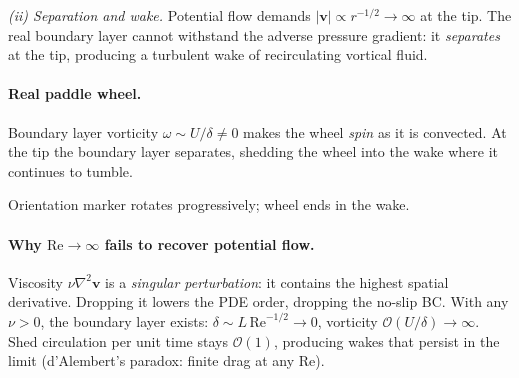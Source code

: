 \documentclass[11pt]{article}
\begin{document}
\textit{(ii) Separation and wake.} Potential flow demands $|\bm v|\propto r^{-1/2}\to\infty$ at the tip. The real boundary layer cannot withstand the adverse pressure gradient: it \emph{separates} at the tip, producing a turbulent wake of recirculating vortical fluid.

\paragraph{Real paddle wheel.} Boundary layer vorticity $\omega\sim U/\delta\neq 0$ makes the wheel \emph{spin} as it is convected. At the tip the boundary layer separates, shedding the wheel into the wake where it continues to tumble.

\begin{center}
\end{center}
Orientation marker rotates progressively; wheel ends in the wake.

\paragraph{Why $\mathrm{Re}\to\infty$ fails to recover potential flow.} Viscosity $\nu\nabla^{2}\bm v$ is a \emph{singular perturbation}: it contains the highest spatial derivative. Dropping it lowers the PDE order, dropping the no-slip BC. With any $\nu>0$, the boundary layer exists: $\delta\sim L\,\mathrm{Re}^{-1/2}\to 0$, vorticity $\mathcal O(U/\delta)\to\infty$. Shed circulation per unit time stays $\mathcal O(1)$, producing wakes that persist in the limit (d'Alembert's paradox: finite drag at any $\mathrm{Re}$).
\end{document}
